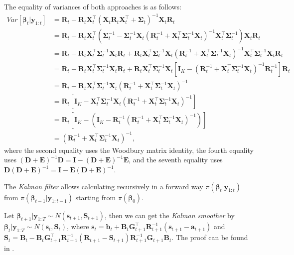 The equality of variances of both approaches is as follows:
\begin{align*}
	Var[\bm{\beta}_t|\bm{y}_{1:t}]&
	= \bm{R}_{t}-\bm{R}_{t}\bm{X}_t^{\top}(\bm{X}_t\bm{R}_{t}\bm{X}_t^\top+\bm{\Sigma}_t)^{-1} \bm{X}_t\bm{R}_{t}\\
	&=\bm{R}_{t}-\bm{R}_{t}\bm{X}_t^{\top}(\bm{\Sigma}_t^{-1}- \bm{\Sigma}_t^{-1}\bm{X}_t(\bm{R}_{t}^{-1}+\bm{X}_t^{\top}\bm{\Sigma}_t^{-1}\bm{X}_t)^{-1}\bm{X}_t^{\top}\bm{\Sigma}_t^{-1})\bm{X}_t\bm{R}_{t}\\
	&=\bm{R}_{t}-\bm{R}_{t}\bm{X}_t^{\top}\bm{\Sigma}_t^{-1}\bm{X}_t\bm{R}_{t}+ \bm{R}_{t}\bm{X}_t^{\top}\bm{\Sigma}_t^{-1}\bm{X}_t(\bm{R}_{t}^{-1}+\bm{X}_t^{\top}\bm{\Sigma}_t^{-1}\bm{X}_t)^{-1}\bm{X}_t^{\top}\bm{\Sigma}_t^{-1}\bm{X}_t\bm{R}_{t}\\
	&=\bm{R}_{t}-\bm{R}_{t}\bm{X}_t^{\top}\bm{\Sigma}_t^{-1}\bm{X}_t\bm{R}_{t}+ \bm{R}_{t}\bm{X}_t^{\top}\bm{\Sigma}_t^{-1}\bm{X}_t[\bm{I}_K-(\bm{R}_{t}^{-1}+\bm{X}_t^{\top}\bm{\Sigma}_t^{-1}\bm{X}_t)^{-1}\bm{R}_{t}^{-1}]\bm{R}_{t}\\
	&=\bm{R}_{t}-\bm{R}_{t}\bm{X}_t^{\top}\bm{\Sigma}_t^{-1}\bm{X}_t(\bm{R}_{t}^{-1}+\bm{X}_t^{\top}\bm{\Sigma}_t^{-1}\bm{X}_t)^{-1}\\
	&=\bm{R}_t[\bm{I}_K-\bm{X}_t^{\top}\bm{\Sigma}_t^{-1}\bm{X}_t(\bm{R}_{t}^{-1}+\bm{X}_t^{\top}\bm{\Sigma}_t^{-1}\bm{X}_t)^{-1}]\\
	&=\bm{R}_{t}[\bm{I}_K-(\bm{I}_K-\bm{R}_{t}^{-1}(\bm{R}_{t}^{-1}+\bm{X}_t^{\top}\bm{\Sigma}_t^{-1}\bm{X}_t)^{-1})]\\
	&=(\bm{R}_{t}^{-1}+\bm{X}_t^{\top}\bm{\Sigma}_t^{-1}\bm{X}_t)^{-1},
\end{align*}
where the second equality uses the Woodbury matrix identity, the fourth equality uses $(\bm{D}+\bm{E})^{-1}\bm{D}=\bm{I}-(\bm{D}+\bm{E})^{-1}\bm{E}$, and the seventh equality uses $\bm{D}(\bm{D}+\bm{E})^{-1}=\bm{I}-\bm{E}(\bm{D}+\bm{E})^{-1}$.  

The \textit{Kalman filter} allows calculating recursively in a forward way $\pi(\bm{\beta}_t|\bm{y}_{1:t})$ from $\pi(\bm{\beta}_{t-1}|\bm{y}_{1:t-1})$ starting from $\pi(\bm{\beta}_0)$.

Let $\bm{\beta}_{t+1}|\bm{y}_{1:T}\sim N(\bm{s}_{t+1},\bm{S}_{t+1})$, then we can get the \textit{Kalman smoother} by $\bm{\beta}_{t}|\bm{y}_{1:T}\sim N(\bm{s}_{t},\bm{S}_{t})$, where $\bm{s}_t=\bm{b}_t+\bm{B}_t\bm{G}_{t+1}^{\top}\bm{R}_{t+1}^{-1}(\bm{s}_{t+1}-\bm{a}_{t+1})$ and $\bm{S}_t=\bm{B}_t-\bm{B}_t\bm{G}_{t+1}^{\top}\bm{R}_{t+1}^{-1}(\bm{R}_{t+1}-\bm{S}_{t+1})\bm{R}_{t+1}^{-1}\bm{G}_{t+1}\bm{B}_{t}$. The proof can be found in \cite[Chap~2]{petris2009dynamic}. 

